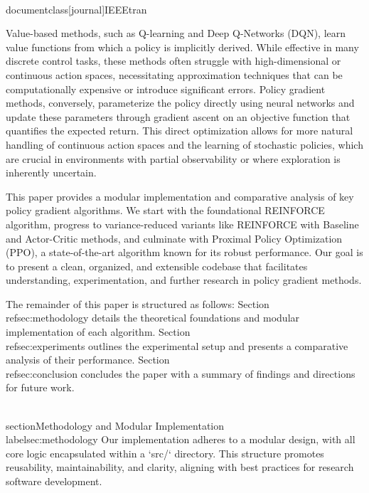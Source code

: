 \\documentclass[journal]{IEEEtran}
\begin{document}
Value-based methods, such as Q-learning and Deep Q-Networks (DQN), learn value functions from which a policy is implicitly derived. While effective in many discrete control tasks, these methods often struggle with high-dimensional or continuous action spaces, necessitating approximation techniques that can be computationally expensive or introduce significant errors. Policy gradient methods, conversely, parameterize the policy directly using neural networks and update these parameters through gradient ascent on an objective function that quantifies the expected return. This direct optimization allows for more natural handling of continuous action spaces and the learning of stochastic policies, which are crucial in environments with partial observability or where exploration is inherently uncertain.

This paper provides a modular implementation and comparative analysis of key policy gradient algorithms. We start with the foundational REINFORCE algorithm, progress to variance-reduced variants like REINFORCE with Baseline and Actor-Critic methods, and culminate with Proximal Policy Optimization (PPO), a state-of-the-art algorithm known for its robust performance. Our goal is to present a clean, organized, and extensible codebase that facilitates understanding, experimentation, and further research in policy gradient methods.

The remainder of this paper is structured as follows: Section \\ref{sec:methodology} details the theoretical foundations and modular implementation of each algorithm. Section \\ref{sec:experiments} outlines the experimental setup and presents a comparative analysis of their performance. Section \\ref{sec:conclusion} concludes the paper with a summary of findings and directions for future work.

\\section{Methodology and Modular Implementation}
\\label{sec:methodology}
Our implementation adheres to a modular design, with all core logic encapsulated within a `src/` directory. This structure promotes reusability, maintainability, and clarity, aligning with best practices for research software development.
\end{document}
